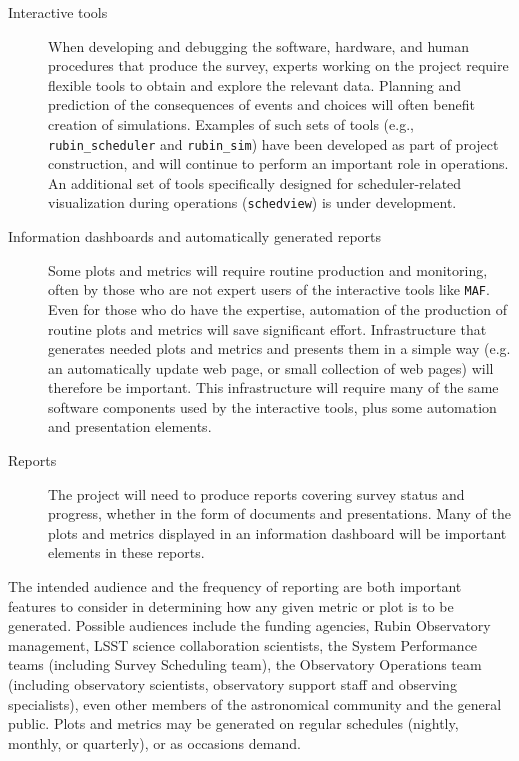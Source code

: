 \begin{description}
\item[{Interactive tools}] When developing and debugging the software, hardware, and human procedures that produce the survey, experts working on the project require flexible tools to obtain and explore the relevant data. Planning and prediction of the consequences of events and choices will often benefit creation of simulations. Examples of such sets of tools (e.g., \texttt{rubin\_scheduler} and \texttt{rubin\_sim}) have been developed as part of project construction, and will continue to perform an important role in operations. An additional set of tools specifically designed for scheduler-related visualization during operations (\texttt{schedview}) is under development. 
\item[{Information dashboards and automatically generated reports}] Some plots and metrics will require routine production and monitoring, often by those who are not expert users of the interactive tools like \texttt{MAF}. Even for those who do have the expertise, automation of the production of routine plots and metrics will save significant effort. Infrastructure that generates needed plots and metrics and presents them in a simple way (e.g. an automatically update web page, or small collection of web pages) will therefore be important. This infrastructure will require many of the same software components used by the interactive tools, plus some automation and presentation elements.
\item[{Reports}] The project will need to produce reports covering survey status and progress, whether in the form of documents and presentations. Many of the plots and metrics displayed in an information dashboard will be important elements in these reports.
\end{description}

The intended audience and the frequency of reporting are both important features to consider in determining how any given metric or plot is to be generated.
Possible audiences include the funding agencies, Rubin Observatory management, LSST science collaboration scientists, the System Performance teams (including Survey Scheduling team), the Observatory Operations team (including observatory scientists, observatory support staff and observing specialists), even other members of the astronomical community and the general public.  
Plots and metrics may be generated on regular schedules (nightly, monthly, or quarterly), or as occasions demand.

